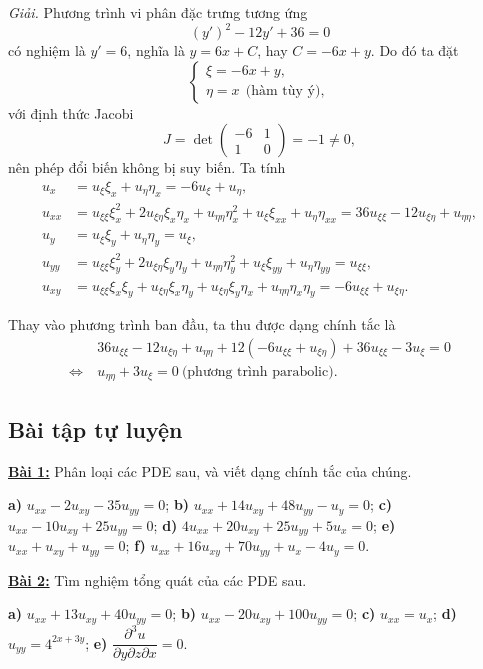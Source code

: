 \documentclass[10pt, a4paper]{article}
\begin{document}
	\textit{Giải.} Phương trình vi phân đặc trưng tương ứng $$(y')^2-12y'+36=0$$
	có nghiệm là $y'=6$, nghĩa là $y=6x+C$, hay $C=-6x+y$. Do đó ta đặt $$\begin{cases}
		\xi=-6x+y,\\
		\eta=x~~\text{(hàm tùy ý)},
	\end{cases}$$
	với định thức Jacobi $$J=\det\begin{pmatrix}
		-6&1\\1&0
	\end{pmatrix}=-1\ne0,$$
	nên phép đổi biến không bị suy biến. Ta tính \begin{align*}
		u_x&=u_\xi\xi_x+u_\eta\eta_x=-6u_\xi+u_\eta,\\
		u_{xx}&=u_{\xi\xi}\xi_x^2+2u_{\xi\eta}\xi_x\eta_x+u_{\eta\eta}\eta_x^2+u_\xi\xi_{xx}+u_\eta\eta_{xx}=36u_{\xi\xi}-12u_{\xi\eta}+u_{\eta\eta},\\
		u_y&=u_\xi\xi_y+u_\eta\eta_y=u_\xi,\\
		u_{yy}&=u_{\xi\xi}\xi_y^2+2u_{\xi\eta}\xi_y\eta_y+u_{\eta\eta}\eta_y^2+u_\xi\xi_{yy}+u_\eta\eta_{yy}=u_{\xi\xi},\\
		u_{xy}&=u_{\xi\xi}\xi_x\xi_y+u_{\xi\eta}\xi_x\eta_y+u_{\xi\eta}\xi_y\eta_x+u_{\eta\eta}\eta_x\eta_y=-6u_{\xi\xi}+u_{\xi\eta}.
	\end{align*}
	
	Thay vào phương trình ban đầu, ta thu được dạng chính tắc là \begin{align*}
		&36u_{\xi\xi}-12u_{\xi\eta}+u_{\eta\eta}+12(-6u_{\xi\xi}+u_{\xi\eta})+36u_{\xi\xi}-3u_\xi=0\\
		\Leftrightarrow~&u_{\eta\eta}+3u_\xi=0~\text{(phương trình parabolic)}.
	\end{align*}
	\subsection{Bài tập tự luyện}
	\textbf{\color{red}\underline{Bài 1:}} Phân loại các PDE sau, và viết dạng chính tắc của chúng.
	\begin{flushleft}
		\textbf{a) }$u_{xx}-2u_{xy}-35u_{yy}=0$;\vskip7pt
		\textbf{b) }$u_{xx}+14u_{xy}+48u_{yy}-u_y=0$;\vskip7pt
		\textbf{c) }$u_{xx}-10u_{xy}+25u_{yy}=0$;\vskip7pt
		\textbf{d) }$4u_{xx}+20u_{xy}+25u_{yy}+5u_x=0$;\vskip7pt
		\textbf{e) }$u_{xx}+u_{xy}+u_{yy}=0$;\vskip7pt
		\textbf{f) }$u_{xx}+16u_{xy}+70u_{yy}+u_x-4u_y=0$.\vskip7pt
	\end{flushleft}\vskip8pt
	\textbf{\color{red}\underline{Bài 2:}} Tìm nghiệm tổng quát của các PDE sau.
	\begin{flushleft}
		\textbf{a) }$u_{xx}+13u_{xy}+40u_{yy}=0$;\vskip7pt
		\textbf{b) }$u_{xx}-20u_{xy}+100u_{yy}=0$;\vskip7pt
		\textbf{c) }$u_{xx}=u_x$;\vskip7pt
		\textbf{d) }$u_{yy}=4^{2x+3y}$;\vskip7pt
		\textbf{e) }$\dfrac{\partial^3u}{\partial y\partial z\partial x}=0$.
	\end{flushleft}
	\newpage
\end{document}

